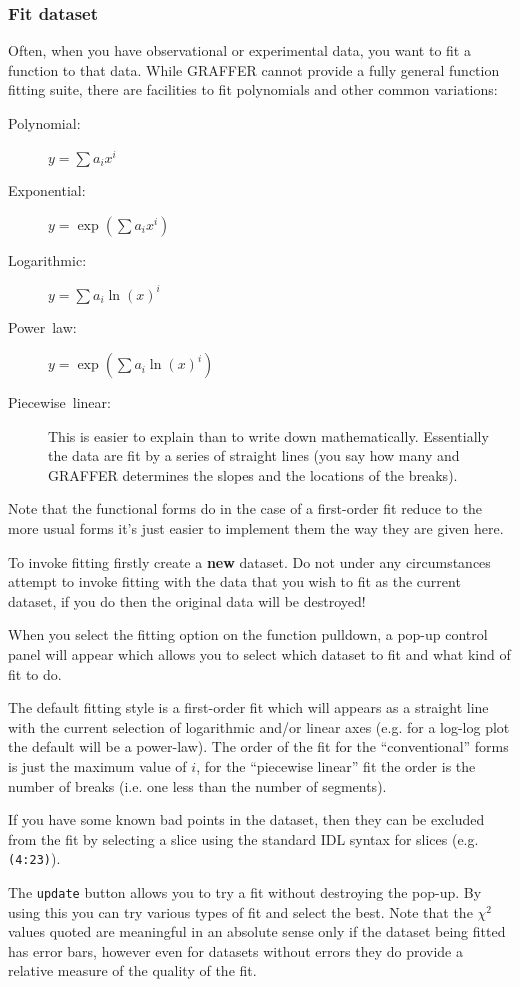\documentclass[11pt,twoside,english]{article}
\begin{document}
\subsubsection{Fit dataset }

Often, when you have observational or experimental data, you want to
fit a function to that data. While GRAFFER cannot provide a fully
general function fitting suite, there are facilities to fit polynomials
and other common variations:

\begin{description}
\item [Polynomial:]$y=\sum a_{i}x^{i}$
\item [Exponential:]$y=\exp(\sum a_{i}x^{i})$
\item [Logarithmic:]$y=\sum a_{i}\ln(x)^{i}$
\item [Power~law:]$y=\exp(\sum a_{i}\ln(x)^{i})$
\item [Piecewise~linear:]This is easier to explain than to write down
  mathematically. Essentially the data are fit by a series of straight
  lines (you say how many and GRAFFER determines the slopes and the
  locations of the breaks).
\end{description}
Note that the functional forms do in the case of a first-order fit
reduce to the more usual forms it's just easier to implement them the
way they are given here.

To invoke fitting firstly create a \textbf{new} dataset. Do not under
any circumstances attempt to invoke fitting with the data that you wish
to fit as the current dataset, if you do then the original data will be
destroyed!

When you select the fitting option on the function pulldown, a pop-up
control panel will appear which allows you to select which dataset to
fit and what kind of fit to do.

The default fitting style is a first-order fit which will appears as a
straight line with the current selection of logarithmic and/or linear
axes (e.g. for a log-log plot the default will be a power-law).  The
order of the fit for the {}``conventional'' forms is just the maximum
value of $i$, for the {}``piecewise linear'' fit the order is the
number of breaks (i.e. one less than the number of segments).

If you have some known bad points in the dataset, then they can be
excluded from the fit by selecting a slice using the standard IDL
syntax for slices (e.g. \texttt{(4:23)}).

The \texttt{update} button allows you to try a fit without destroying
the pop-up. By using this you can try various types of fit and select
the best. Note that the $\chi^{2}$ values quoted are meaningful in an
absolute sense only if the dataset being fitted has error bars, however
even for datasets without errors they do provide a relative measure of
the quality of the fit.
\end{document}
